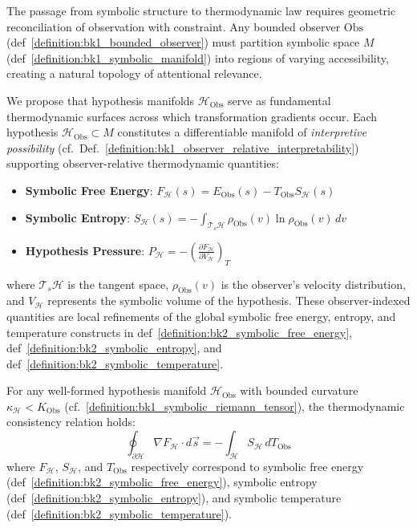 \begin{scholium} 
\label{scholium:bk2_on_hypotheses_as_thermodyn}
The passage from symbolic structure to thermodynamic law requires geometric reconciliation of observation with constraint. Any bounded observer $\text{Obs}$ (def~\ref{definition:bk1_bounded_observer}) must partition symbolic space $M$ (def~\ref{definition:bk1_symbolic_manifold}) into regions of varying accessibility, creating a natural topology of attentional relevance.

We propose that hypothesis manifolds $\mathcal{H}_{\text{Obs}}$ serve as fundamental thermodynamic surfaces across which transformation gradients occur. Each hypothesis $\mathcal{H}_{\text{Obs}} \subset M$ constitutes a differentiable manifold of \emph{interpretive possibility} (cf.~Def.~\ref{definition:bk1_observer_relative_interpretability}) supporting observer-relative thermodynamic quantities:

\begin{itemize}
    \item \textbf{Symbolic Free Energy}: $F_{\mathcal{H}}(s) = E_{\text{Obs}}(s) - T_{\text{Obs}} S_{\mathcal{H}}(s)$
    \item \textbf{Symbolic Entropy}: $S_{\mathcal{H}}(s) = -\int_{\mathcal{T}_s\mathcal{H}} \rho_{\text{Obs}}(v) \ln \rho_{\text{Obs}}(v) \, dv$
    \item \textbf{Hypothesis Pressure}: $P_{\mathcal{H}} = -\left(\frac{\partial F_{\mathcal{H}}}{\partial V_{\mathcal{H}}}\right)_{T}$
\end{itemize}

where $\mathcal{T}_s\mathcal{H}$ is the tangent space, $\rho_{\text{Obs}}(v)$ is the observer's velocity distribution, and $V_{\mathcal{H}}$ represents the symbolic volume of the hypothesis.
These observer-indexed quantities are local refinements of the global symbolic free energy, entropy, and temperature constructs in def~\ref{definition:bk2_symbolic_free_energy}, def~\ref{definition:bk2_symbolic_entropy}, and def~\ref{definition:bk2_symbolic_temperature}.
\end{scholium}

\begin{lemma} 
\label{lemma:bk2_thermodynamic_consistency_hypothesis_manifolds}
For any well-formed hypothesis manifold $\mathcal{H}_{\text{Obs}}$ with bounded curvature $\kappa_{\mathcal{H}} < K_{\text{Obs}}$ (cf.~\ref{definition:bk1_symbolic_riemann_tensor}), the thermodynamic consistency relation holds:
\[
\oint_{\partial \mathcal{H}} \nabla F_{\mathcal{H}} \cdot d\vec{s} = -\int_{\mathcal{H}} S_{\mathcal{H}} \, dT_{\text{Obs}}
\]
where $F_{\mathcal{H}}$, $S_{\mathcal{H}}$, and $T_{\text{Obs}}$ respectively correspond to symbolic free energy (def~\ref{definition:bk2_symbolic_free_energy}), symbolic entropy (def~\ref{definition:bk2_symbolic_entropy}), and symbolic temperature (def~\ref{definition:bk2_symbolic_temperature}).
\end{lemma}

